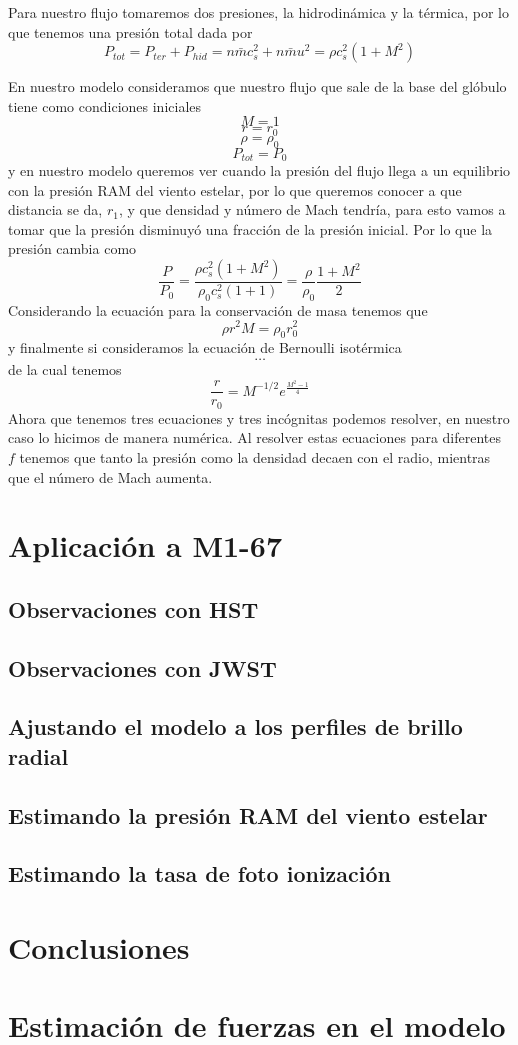 \documentclass{book}
\begin{document}
Para nuestro flujo tomaremos dos presiones, la hidrodinámica y la térmica, por lo que tenemos una presión total dada por
\[P_{tot}=P_{ter}+P_{hid}=n\bar{m}c_s^2+n\bar{m}u^2=\rho c_s^2(1+M^2)\]

En nuestro modelo consideramos que nuestro flujo que sale de la base del glóbulo tiene como condiciones iniciales
\[M=1\]
\[r=r_0\]
\[\rho=\rho_0\]
\[P_{tot}=P_0\]
y en nuestro modelo queremos ver cuando la presión del flujo llega a un equilibrio con la presión RAM del viento estelar, por lo que queremos conocer a que distancia se da, $r_1$, y que densidad y número de Mach tendría, para esto vamos a tomar que la presión disminuyó una fracción de la presión inicial. Por lo que la presión cambia como 
\[\frac{P}{P_0}=\frac{\rho c_s^2(1+M^2)}{\rho_0 c_s^2(1+1)}=\frac{\rho}{\rho_0}\frac{1+M^2}{2}\]
Considerando la ecuación para la conservación de masa tenemos que
\[\rho r^2M	=\rho_0 r_0^2\]
y finalmente si consideramos la ecuación de Bernoulli isotérmica 
\[\dots\]
de la cual tenemos 
\[\frac{r}{r_0}=M^{-1/2}e^{\frac{M^2-1}{4}}\]
Ahora que tenemos tres ecuaciones y tres incógnitas podemos resolver, en nuestro caso lo hicimos de manera numérica. Al resolver estas ecuaciones para diferentes $f$ tenemos que tanto la presión como la densidad decaen con el radio, mientras que el número de Mach aumenta.







\chapter{Aplicación a M1-67}

\section{Observaciones con HST}

\section{Observaciones con JWST}

\section{Ajustando el modelo a los perfiles de brillo radial}

\section{Estimando la presión RAM del viento estelar}

\section{Estimando la tasa de foto ionización}

\chapter{Conclusiones}

\appendix
\chapter{Estimación de fuerzas en el modelo}


\end{document}
